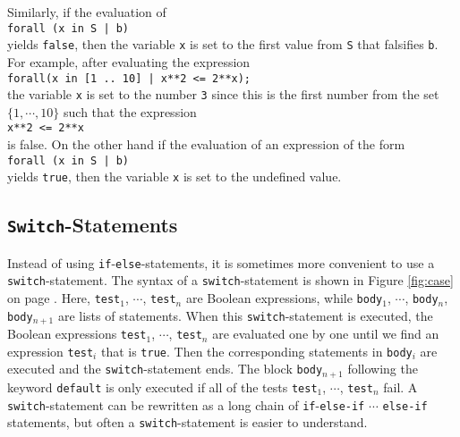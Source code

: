 Similarly, if the evaluation of 
\\[0.2cm]
\hspace*{1.3cm}
\texttt{forall (x in S | b)}
\\[0.2cm]
yields \texttt{false}, then the variable \texttt{x} is set to the first value from \texttt{S} that falsifies \texttt{b}.
For example, after evaluating the expression
\\[0.2cm]
\hspace*{1.3cm}
\texttt{forall(x in [1 .. 10] | x**2 <= 2**x);}
\\[0.2cm]
the variable \texttt{x} is set to the number \texttt{3} since this is the first number from the set
$\{1,\cdots,10\}$ such that the expression
\\[0.2cm]
\hspace*{1.3cm}
\texttt{x**2 <= 2**x}
\\[0.2cm]
is false.  On the other hand if the evaluation of an expression of the form
\\[0.2cm]
\hspace*{1.3cm}
\texttt{forall (x in S | b)}
\\[0.2cm]
yields \texttt{true}, then the variable \texttt{x} is set to the undefined value. \eox

\subsection{\texttt{Switch}-Statements}
Instead of using \texttt{if}-\texttt{else}-statements, it is sometimes more convenient to use a
\texttt{switch}-statement. The syntax of a \texttt{switch}-statement is shown in Figure
\ref{fig:case} on page \pageref{fig:case}.  Here, 
\texttt{test}$_1$, $\cdots$, \texttt{test}$_n$ are Boolean expressions, while
\texttt{body}$_1$, $\cdots$, \texttt{body}$_n$, \texttt{body}$_{n+1}$ are lists of statements.
When this \texttt{switch}-statement is executed, the Boolean expressions
\texttt{test}$_1$, $\cdots$, \texttt{test}$_n$ are evaluated one by one until we find an expression 
\texttt{test}$_i$ that is \texttt{true}.  Then the corresponding statements in \texttt{body}$_i$ are executed and
the \texttt{switch}-statement ends.   The block \texttt{body}$_{n+1}$ following the keyword \texttt{default} is
only executed if all of the tests \texttt{test}$_1$, $\cdots$, \texttt{test}$_n$ fail.
A \texttt{switch}-statement can be rewritten as a long chain of \texttt{if}-\texttt{else-if} $\cdots$
\texttt{else-if} statements, but often a \texttt{switch}-statement is easier to understand.



